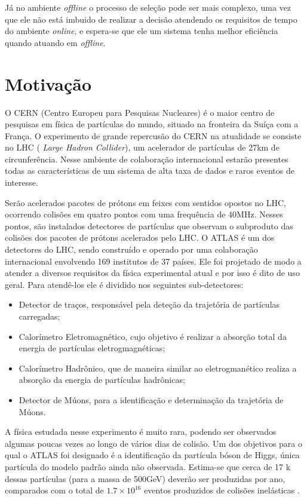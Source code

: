 Já no ambiente {\it offline} o processo de seleção pode ser mais
complexo, uma vez que ele não está imbuido de realizar a decisão atendendo os
requisitos de tempo do ambiente {\it online}, e espera-se que ele um sistema
tenha melhor eficiência quando atuando em {\it offline}.

\section{Motivação} 

O CERN (Centro Europeu para Pesquisas Nucleares) é o maior centro de
pesquisas em física de partículas do mundo, situado na fronteira da Suíça com a
França. O experimento de grande repercusão do CERN na atualidade se consiste no LHC ({\it
Large Hadron Collider}), um acelerador de partículas de 27km de
circunferência. Nesse ambiente de colaboração internacional estarão presentes
todas as características de um sistema de alta taxa de dados e raros eventos de
interesse.

Serão acelerados pacotes de prótons em feixes com sentidos opostos no LHC,
ocorrendo colisões em quatro pontos com uma frequência de 40MHz. Nesses pontos, são instalados 
detectores de partículas que observam o subproduto das colisões dos pacotes de prótons 
acelerados pelo LHC. O ATLAS é um dos detectores do LHC, sendo construído e operado por 
uma colaboração internacional envolvendo 169 institutos de 37 países. Ele foi projetado 
de modo a atender a diversos requisitos da física experimental atual e por isso é dito de uso
geral. Para atendê-los ele é dividido nos seguintes sub-detectores:

\begin{itemize}
\item Detector de traços, responsável pela deteção da trajetória de partículas carregadas;
\item Calorímetro Eletromagnético, cujo objetivo é realizar a absorção total da
energia de partículas eletrogmagnéticas;
\item Calorímetro Hadrônico, que de maneira similar ao eletrogmanético realiza a
absorção da energia de partículas hadrônicas;
\item Detector de Múons, para a identificação e determinação da trajetória de
Múons.
\end{itemize}


A física estudada nesse experimento é muito rara, podendo ser observados algumas
poucas vezes ao longo de vários dias de colisão. Um dos objetivos para o qual o
ATLAS foi designado é a identificação da partícula bóson de Higgs, única partícula 
do modelo padrão ainda não observada. Estima-se que cerca de 17 k dessas
partículas (para a massa de 500GeV) deverão ser produzidas por ano, comparados
com o total de $1.7\times10^{16}$ eventos produzidos de colisões inelásticas \cite{resumo_ATLAS}. 

